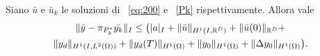 \begin{teorema}
\label{convy}

Siano $ \bar{u} $ e $ \bar{u}_k $ le soluzioni di  ~\eqref{eq:200} e ~\eqref{Pk} rispettivamente. Allora vale
\begin{multline}
\lVert\bar{y}-\pi_{P^*_k}\bar{y_k}\rVert_I\le\big( \lvert a\rvert_I + \lVert\bar{u}\rVert_{H^1(I,\mathbb{R}^D)} + \lVert\bar{u}(0)\rVert_{\mathbb{R}^D} + \\ 
\lVert y_d\rVert_{H^1(I,L^2(\Omega))} + \lVert y_d(T)\rVert_{H^1(\Omega)} + \lVert y_0\rVert_{H^1(\Omega)} + \lVert\Delta y_0\rVert_{H^1(\Omega)}\big).
\end{multline}

\end{teorema}  